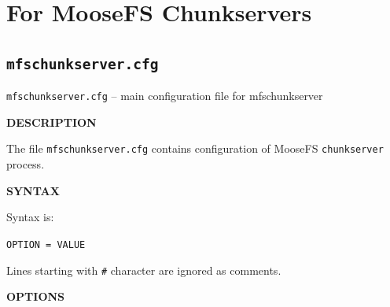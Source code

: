 \documentclass[a4paper,11pt,english]{report}
\def\code#1{\texttt{#1}}
\begin{document}
		\section{For MooseFS Chunkservers}
			\subsection{\code{mfschunkserver.cfg}}
				\code{mfschunkserver.cfg} -- main configuration file for mfschunkserver
				\bigskip
				
				\textbf{DESCRIPTION}
				
				The   file   \code{mfschunkserver.cfg}   contains   configuration  of  MooseFS \code{chunkserver} process.
				\bigskip
				
				\textbf{SYNTAX}
				
				Syntax is:

				\code{OPTION = VALUE}

				Lines starting with \code{\#} character are ignored as comments.
				\bigskip
				
				\textbf{OPTIONS}
				
\end{document}
